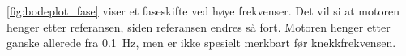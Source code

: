\autoref{fig:bodeplot_fase} viser et faseskifte ved høye frekvenser. Det vil si at motoren henger etter referansen, siden referansen endres så fort. Motoren henger etter ganske allerede fra \SI{0.1}{\hertz}, men er ikke spesielt merkbart før knekkfrekvensen.























%     



%     

